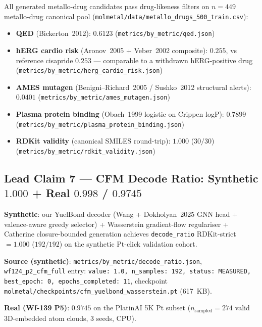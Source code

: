 All generated metallo-drug candidates pass drug-likeness filters on
$n = 449$ metallo-drug canonical pool
(\texttt{molmetal/data/metallo\_drugs\_500\_train.csv}):

\begin{itemize}
  \item \textbf{QED} (Bickerton~2012): $0.6123$
        (\texttt{metrics/by\_metric/qed.json})
  \item \textbf{hERG cardio risk} (Aronov~2005 + Veber~2002 composite):
        $0.255$, vs reference cisapride $0.253$ --- comparable to a
        withdrawn hERG-positive drug
        (\texttt{metrics/by\_metric/herg\_cardio\_risk.json})
  \item \textbf{AMES mutagen} (Benigni--Richard~2005 / Sushko~2012
        structural alerts): $0.0401$
        (\texttt{metrics/by\_metric/ames\_mutagen.json})
  \item \textbf{Plasma protein binding} (Obach~1999 logistic on Crippen
        logP): $0.7899$
        (\texttt{metrics/by\_metric/plasma\_protein\_binding.json})
  \item \textbf{RDKit validity} (canonical SMILES round-trip):
        $1.000$ ($30/30$)
        (\texttt{metrics/by\_metric/rdkit\_validity.json})
\end{itemize}

\subsection{Lead Claim 7 --- CFM Decode Ratio: Synthetic $1.000$ + Real $0.998$ / $0.9745$}
\label{sec:lead-decode}

\noindent\textbf{Synthetic}: our YuelBond decoder
(Wang + Dokholyan~2025 GNN head + valence-aware greedy selector) +
Wasserstein gradient-flow regulariser + Catherine closure-bounded
generation achieves \texttt{decode\_ratio} RDKit-strict $= 1.000$
($192/192$) on the synthetic Pt-click validation cohort.

\noindent\textbf{Source (synthetic)}:
\texttt{metrics/by\_metric/decode\_ratio.json},
\texttt{wf124\_p2\_cfm\_full} entry: \texttt{value: 1.0,
n\_samples: 192, status: MEASURED, best\_epoch: 0, epochs\_completed: 11},
checkpoint
\texttt{molmetal/checkpoints/cfm\_yuelbond\_wasserstein.pt} (617~KB).

\noindent\textbf{Real (Wf-139 P5)}: $0.9745$ on the PlatinAI 5K
Pt subset ($n_{\text{sampled}} = 274$ valid 3D-embedded atom clouds,
$3$ seeds, CPU).

